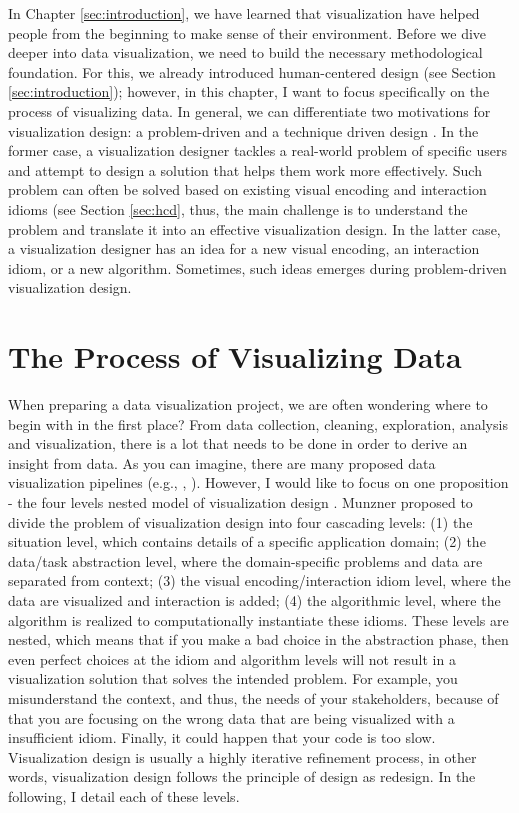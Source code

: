 \documentclass[
]{book}
\begin{document}
In Chapter \ref{sec:introduction}, we have learned that visualization have helped people from the beginning to make sense of their environment. Before we dive deeper into data visualization, we need to build the necessary methodological foundation. For this, we already introduced human-centered design (see Section \ref{sec:introduction}); however, in this chapter, I want to focus specifically on the process of visualizing data. In general, we can differentiate two motivations for visualization design: a problem-driven and a technique driven design \citep{munzner2014visualization}. In the former case, a visualization designer tackles a real-world problem of specific users and attempt to design a solution that helps them work more effectively. Such problem can often be solved based on existing visual encoding and interaction idioms (see Section \ref{sec:hcd}, thus, the main challenge is to understand the problem and translate it into an effective visualization design. In the latter case, a visualization designer has an idea for a new visual encoding, an interaction idiom, or a new algorithm. Sometimes, such ideas emerges during problem-driven visualization design.

\hypertarget{the-process-of-visualizing-data-1}{%
\section{The Process of Visualizing Data}\label{the-process-of-visualizing-data-1}}

When preparing a data visualization project, we are often wondering where to begin with in the first place? From data collection, cleaning, exploration, analysis and visualization, there is a lot that needs to be done in order to derive an insight from data. As you can imagine, there are many proposed data visualization pipelines (e.g., \citep{fry2008visualizing}, \citep{kirk2019data}). However, I would like to focus on one proposition - the four levels nested model of visualization design \citep{munzner2014visualization}. Munzner proposed to divide the problem of visualization design into four cascading levels: (1) the situation level, which contains details of a specific application domain; (2) the data/task abstraction level, where the domain-specific problems and data are separated from context; (3) the visual encoding/interaction idiom level, where the data are visualized and interaction is added; (4) the algorithmic level, where the algorithm is realized to computationally instantiate these idioms. These levels are nested, which means that if you make a bad choice in the abstraction phase, then even perfect choices at the idiom and algorithm levels will not result in a visualization solution that solves the intended problem. For example, you misunderstand the context, and thus, the needs of your stakeholders, because of that you are focusing on the wrong data that are being visualized with a insufficient idiom. Finally, it could happen that your code is too slow. Visualization design is usually a highly iterative refinement process, in other words, visualization design follows the principle of design as redesign. In the following, I detail each of these levels.
\end{document}
